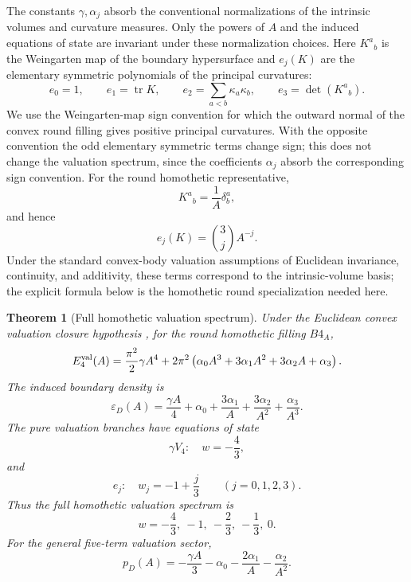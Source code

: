\documentclass[11pt,a4paper]{article}
\def\Bfour{B4}%
\numberwithin{equation}{section}
\theoremstyle{definition}
\theoremstyle{plain}
\newtheorem{theorem}[criterion]{Theorem}
\theoremstyle{remark}
\newcommand{\Bfour}{B^4}
\newcommand{\Efour}{E_4}
\newcommand{\epsD}{\varepsilon_D}
\newcommand{\pD}{p_D}
\begin{document}
The constants \(\gamma,\alpha_j\) absorb the conventional normalizations of the intrinsic volumes and curvature measures. Only the powers of \(A\) and the induced equations of state are invariant under these normalization choices. Here \(K^a{}_b\) is the Weingarten map of the boundary hypersurface and \(e_j(K)\) are the elementary symmetric polynomials of the principal curvatures:
\begin{equation}
e_0=1,
\qquad
e_1=\operatorname{tr}K,
\qquad
e_2=\sum_{a<b}\kappa_a\kappa_b,
\qquad
e_3=\det(K^a{}_b).
\end{equation}
We use the Weingarten-map sign convention for which the outward normal of the convex round filling gives positive principal curvatures. With the opposite convention the odd elementary symmetric terms change sign; this does not change the valuation spectrum, since the coefficients \(\alpha_j\) absorb the corresponding sign convention. For the round homothetic representative,
\begin{equation}
K^a{}_b=\frac{1}{A}\delta^a_b,
\end{equation}
and hence
\begin{equation}
e_j(K)=\binom{3}{j}A^{-j}.
\end{equation}
Under the standard convex-body valuation assumptions of Euclidean invariance, continuity, and additivity, these terms correspond to the intrinsic-volume basis; the explicit formula below is the homothetic round specialization needed here.

\begin{theorem}[Full homothetic valuation spectrum]
Under the Euclidean convex valuation closure hypothesis \cite{Hadwiger1957,Schneider2014}, for the round homothetic filling \(\Bfour_A\),
\begin{equation}
\Efour^{\rm val}(A)
=\frac{\pi^2}{2}\gamma A^4
+2\pi^2\left(
\alpha_0A^3+3\alpha_1A^2+3\alpha_2A+\alpha_3
\right).
\end{equation}
The induced boundary density is
\begin{equation}
\epsD(A)
=\frac{\gamma A}{4}
+\alpha_0+\frac{3\alpha_1}{A}
+\frac{3\alpha_2}{A^2}
+\frac{\alpha_3}{A^3}.
\end{equation}
The pure valuation branches have equations of state
\begin{equation}
\gamma V_4:\quad w=-\frac{4}{3},
\end{equation}
and
\begin{equation}
e_j:\quad w_j=-1+\frac{j}{3}\qquad (j=0,1,2,3).
\end{equation}
Thus the full homothetic valuation spectrum is
\begin{equation}
w=-\frac{4}{3},\ -1,\ -\frac{2}{3},\ -\frac{1}{3},\ 0.
\end{equation}
For the general five-term valuation sector,
\begin{equation}
\pD(A)=-\frac{\gamma A}{3}-\alpha_0-\frac{2\alpha_1}{A}-\frac{\alpha_2}{A^2}.
\end{equation}
\end{theorem}
\end{document}
